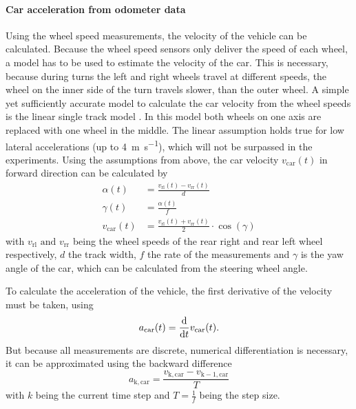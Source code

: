 \paragraph{Car acceleration from odometer data}\mbox{}
\label{para:acc_from_odom}\par
Using the wheel speed measurements, the velocity of the vehicle can be calculated.
Because the wheel speed sensors only deliver the speed of each wheel, a model has to be used to estimate the velocity of the car.
This is necessary, because during turns the left and right wheels travel at different speeds, the wheel on the inner side of the turn travels slower, than the outer wheel.
A simple yet sufficiently accurate model to calculate the car velocity from the wheel speeds is the linear single track model \cite{Mitschke2014}.
In this model both wheels on one axis are replaced with one wheel in the middle.
The linear assumption holds true for low lateral accelerations (up to \SI{4}{\metre\per\second}), which will not be surpassed in the experiments.
Using the assumptions from above, the car velocity $v_\mathrm{car}(t)$ in forward direction can be calculated by
\begin{align}
	\alpha(t)         & = \frac{v_\mathrm{rl}(t) - v_\mathrm{rr}(t)}{d}                  \\
	\gamma(t)         & = \frac{\alpha(t)}{f}                                            \\
	v_\mathrm{car}(t) & = \frac{v_\mathrm{rl}(t) + v_\mathrm{rr}(t)}{2}\cdot\cos(\gamma)
	\label{eq:v_car}
\end{align}
with $v_\mathrm{rl} \text{ and } v_\mathrm{rr}$ being the wheel speeds of the rear right and rear left wheel respectively, $d$ the track width, $f$ the rate of the measurements and $\gamma$ is the yaw angle of the car, which can be calculated from the steering wheel angle.\par
To calculate the acceleration of the vehicle, the first derivative of the velocity must be taken, using
\begin{equation}
	a_\mathrm{car}(t) = \dv{t}v_\mathrm{car}(t).
\end{equation}
But because all measurements are discrete, numerical differentiation is necessary, it can be approximated using the backward difference
\begin{equation}
	a_\mathrm{k, car} = \frac{v_\mathrm{k, car} - v_\mathrm{k - 1, car}}{T}
\end{equation}
with $k$ being the current time step and $T=\frac{1}{f}$ being the step size.\par
